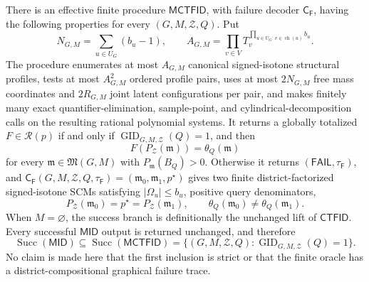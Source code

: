 There is an effective finite procedure \(\mathsf{MCTFID}\), with failure decoder \(\mathsf C_{\mathsf F}\), having the following properties for every \((G,M,\mathcal Z,Q)\).  Put
\[
 N_{G,M}=\sum_{u\in U_G}(b_u-1),
 \qquad
 A_{G,M}=\prod_{v\in V}T_v^{\prod_{u\in U_G:\,v\in\operatorname{ch}(u)}b_u}.
\]
The procedure enumerates at most \(A_{G,M}\) canonical signed-isotone structural profiles, tests at most \(A_{G,M}^2\) ordered profile pairs, uses at most \(2N_{G,M}\) free mass coordinates and \(2R_{G,M}\) joint latent configurations per pair, and makes finitely many exact quantifier-elimination, sample-point, and cylindrical-decomposition calls on the resulting rational polynomial systems.  It returns a globally totalized \(F\in\mathcal R(p)\) if and only if \(\operatorname{GID}_{G,M,\mathcal Z}(Q)=1\), and then
\[
 F(P_{\mathcal Z}(\mathfrak m))=\theta_Q(\mathfrak m)
\]
for every \(\mathfrak m\in\mathfrak M(G,M)\) with \(P_{\mathfrak m}(B_Q)>0\).  Otherwise it returns \((\mathsf{FAIL},\tau_{\mathsf F})\), and \(\mathsf C_{\mathsf F}(G,M,\mathcal Z,Q,\tau_{\mathsf F})=(\mathfrak m_0,\mathfrak m_1,p^{\star})\) gives two finite district-factorized signed-isotone SCMs satisfying \(|\Omega_u|\le b_u\), positive query denominators,
\[
 P_{\mathcal Z}(\mathfrak m_0)=p^{\star}=P_{\mathcal Z}(\mathfrak m_1),
 \qquad
 \theta_Q(\mathfrak m_0)\ne\theta_Q(\mathfrak m_1).
\]
When \(M=\varnothing\), the success branch is definitionally the unchanged lift of \(\mathsf{CTFID}\).  Every successful \(\mathsf{MID}\) output is returned unchanged, and therefore
\[
 \operatorname{Succ}(\mathsf{MID})
 \subseteq\operatorname{Succ}(\mathsf{MCTFID})
 =\{(G,M,\mathcal Z,Q):\operatorname{GID}_{G,M,\mathcal Z}(Q)=1\}.
\]
No claim is made here that the first inclusion is strict or that the finite oracle has a district-compositional graphical failure trace.
